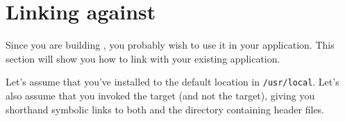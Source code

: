 %
%




\section{Linking against \libflame}
\label{sec:linking}


Since you are building \libflamens, you probably wish to use it in your
application.
This section will show you how to link \libflame with your existing application.

Let's assume that you've installed \libflame to the default location in
{\tt /usr/local}.
Let's also assume that you invoked the \install target (and not the
\installwithoutsymlinks target), giving
you shorthand symbolic links to both \libflame and the directory containing
header files.

